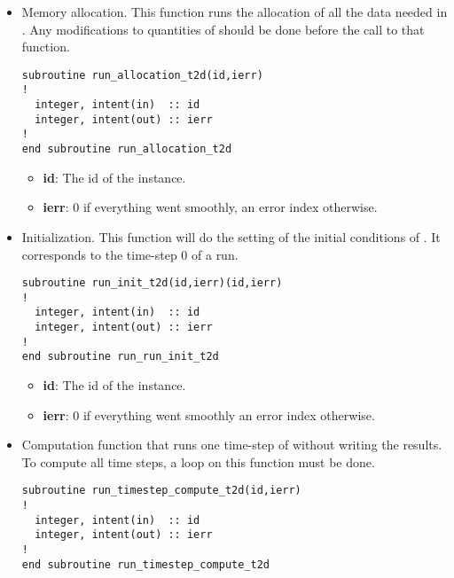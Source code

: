 \begin{itemize}
\begin{WarningBlock}{Warning:}
\centering
With the API we are not using the temporary folder (this folder was created by
the \python environment and all the file declared in the steering file
where copied and renamed inside that folder) which means that the name and path
given in the steering file will be used.
\end{WarningBlock}

\item Memory allocation. This function runs the allocation of all the data
  needed in . Any modifications to quantities of 
  should be done before the call to that function.

\begin{lstlisting}
subroutine run_allocation_t2d(id,ierr)
!
  integer, intent(in)  :: id
  integer, intent(out) :: ierr
!
end subroutine run_allocation_t2d
\end{lstlisting}

\begin{itemize}
\item \textbf{id}: The id of the instance.
\item \textbf{ierr}: 0 if everything went smoothly, an error index otherwise.
\end{itemize}

\item Initialization. This function will do the setting of the initial
  conditions of . It corresponds to the time-step 0 of a
   run.

\begin{lstlisting}
subroutine run_init_t2d(id,ierr)(id,ierr)
!
  integer, intent(in)  :: id
  integer, intent(out) :: ierr
!
end subroutine run_run_init_t2d
\end{lstlisting}

\begin{itemize}
\item \textbf{id}: The id of the instance.
\item \textbf{ierr}: 0 if everything went smoothly an error index otherwise.
\end{itemize}


\item Computation function that runs one time-step of  without
  writing the results. To compute all time steps, a loop on this function must
  be done.

\begin{lstlisting}
subroutine run_timestep_compute_t2d(id,ierr)
!
  integer, intent(in)  :: id
  integer, intent(out) :: ierr
!
end subroutine run_timestep_compute_t2d
\end{lstlisting}



\end{itemize}
